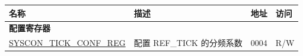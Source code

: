 \begin{longtable}{ | p{6cm} | p{7.2cm} | p{1.3cm} | p{1cm} | }
\hline\rowcolor{lightgray}
名称 & 描述 &  地址 & 访问 \\ \hline
\endhead
\multicolumn{4}{|l|}{\textbf{配置寄存器}} \\ \hline
\hyperref[regdesc:SYSCONTICKCONFREG]{SYSCON\_TICK\_CONF\_REG} & 配置 REF\_TICK 的分频系数 & \hexprefix{}0004 & R/W \\ \hline
\end{longtable}
